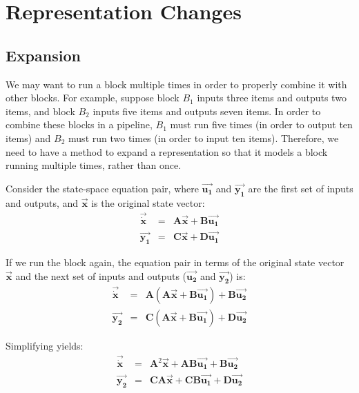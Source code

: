 \section{Representation Changes}

\subsection{Expansion}

    We may want to run a block multiple times in order to
properly combine it with other blocks. For example, suppose block
$B_1$ inputs three items and outputs two items, and block $B_2$
inputs five items and outputs seven items. In order to combine
these blocks in a pipeline, $B_1$ must run five times (in order to
output ten items) and $B_2$ must run two times (in order to input
ten items). Therefore, we need to have a method to expand a
representation so that it models a block running multiple times,
rather than once.

    Consider the state-space equation pair, where $\vec{\mathbf{u_1}}$ and
$\vec{\mathbf{y_1}}$ are the first set of inputs and outputs, and
$\vec{\mathbf{x}}$ is the original state vector:
\begin{eqnarray*}
\vec{\dot{\mathbf{x}}} & = & \mathbf{A}\vec{\mathbf{x}} + \mathbf{B}\vec{\mathbf{u_1}} \\
\vec{\mathbf{y_1}} & = & \mathbf{C}\vec{\mathbf{x}} +
\mathbf{D}\vec{\mathbf{u_1}}
\end{eqnarray*}

    If we run the block again, the equation pair in terms of the
original state vector $\vec{\mathbf{x}}$ and the next set of
inputs and outputs ($\vec{\mathbf{u_2}}$ and $\vec{\mathbf{y_2}}$)
is:
\begin{eqnarray*}
\vec{\dot{\mathbf{x}}} & = & \mathbf{A}(\mathbf{A}\vec{\mathbf{x}}
+
\mathbf{B}\vec{\mathbf{u_1}}) + \mathbf{B}\vec{\mathbf{u_2}} \\
\vec{\mathbf{y_2}} & = & \mathbf{C}(\mathbf{A}\vec{\mathbf{x}} +
\mathbf{B}\vec{\mathbf{u_1}}) + \mathbf{D}\vec{\mathbf{u_2}}
\end{eqnarray*}

Simplifying yields:
\begin{eqnarray*}
\vec{\dot{\mathbf{x}}} & = & \mathbf{A}^2\vec{\mathbf{x}} +
\mathbf{AB}\vec{\mathbf{u_1}} + \mathbf{B}\vec{\mathbf{u_2}} \\
\vec{\mathbf{y_2}} & = & \mathbf{CA}\vec{\mathbf{x}} +
\mathbf{CB}\vec{\mathbf{u_1}} + \mathbf{D}\vec{\mathbf{u_2}}
\end{eqnarray*}

